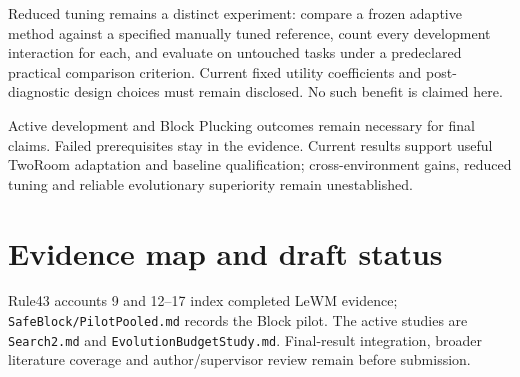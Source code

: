 \documentclass[sigconf,nonacm]{acmart}
\begin{document}
Reduced tuning remains a distinct experiment: compare a frozen adaptive method
against a specified manually tuned reference, count every development interaction
for each, and evaluate on untouched tasks under a predeclared practical comparison
criterion. Current fixed utility coefficients and post-diagnostic design choices
must remain disclosed. No such benefit is claimed here.

Active development and Block Plucking outcomes remain necessary for final claims.
Failed prerequisites stay in the evidence. Current results support useful TwoRoom
adaptation and baseline qualification; cross-environment gains, reduced tuning and
reliable evolutionary superiority remain unestablished.

\section*{Evidence map and draft status}
Rule43 accounts 9 and 12--17 index completed LeWM evidence;
\texttt{SafeBlock/PilotPooled.md} records the Block pilot. The active studies are
\texttt{Search2.md} and \texttt{EvolutionBudget\allowbreak Study.md}.
Final-result integration, broader literature coverage and author/supervisor review
remain before submission.
\end{document}
